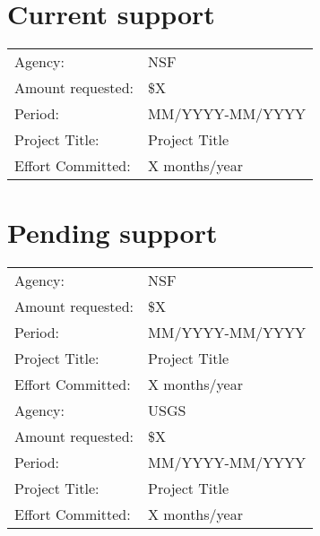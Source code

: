 \section*{Current support}
\begin{tabular}{p{}p{}}\toprule
Agency: 		& NSF			\\
Amount requested: 	& \$X			\\
Period: 		& MM/YYYY-MM/YYYY	\\
Project Title:		& Project Title 	\\
Effort Committed: 	& X months/year		\\\bottomrule
\end{tabular}

\vspace*{\baselineskip}
\section*{Pending support}
\begin{tabular}{p{}p{}}\toprule
Agency: 		& NSF			\\
Amount requested: 	& \$X			\\
Period: 		& MM/YYYY-MM/YYYY	\\
Project Title:		& Project Title 	\\
Effort Committed: 	& X months/year		\\\midrule
Agency: 		& USGS			\\
Amount requested: 	& \$X			\\
Period: 		& MM/YYYY-MM/YYYY	\\
Project Title:		& Project Title 	\\
Effort Committed: 	& X months/year		\\\bottomrule
\end{tabular}
